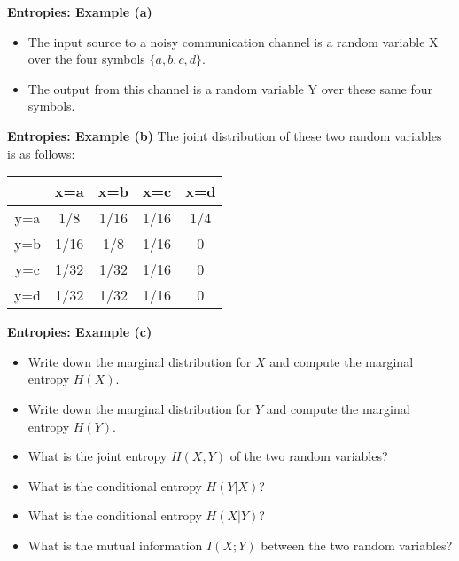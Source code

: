 ﻿%
\medskip
\noindent \textbf{Entropies: Example (a)}
\begin{itemize}
\item The input source to a noisy communication channel is a random variable X over the
four symbols $\{a, b, c, d\}$. \item  The output from this channel is a random variable Y over these same
four symbols.
\end{itemize}


\medskip
\noindent \textbf{Entropies: Example (b)}
The joint distribution of these two random variables is as follows:\\ \bigskip
\begin{center}
\begin{tabular}{|c|c|c|c|c|}
\hline
&x=a& x=b & x=c & x=d \\ \hline
y=a &1/8 &1/16 &1/16 &1/4 \\ \hline
y=b &1/16 & 1/8& 1/16& 0 \\ \hline
y=c & 1/32&1/32 & 1/16 & 0\\ \hline
y=d & 1/32& 1/32& 1/16 & 0\\ \hline 
\end{tabular}
\end{center}

\medskip
\noindent \textbf{Entropies: Example (c)}
\begin{itemize}
\item Write down the marginal distribution for $X$ and compute the marginal entropy $H(X)$.
\item Write down the marginal distribution for $Y$ and compute the marginal entropy $H(Y )$.
\item What is the joint entropy $H(X, Y ) $ of the two random variables?
\item What is the conditional entropy $H(Y|X)$?
\item What is the conditional entropy $H(X|Y)$?
\item What is the mutual information $I(X;Y)$ between the two random variables?
\end{itemize}

